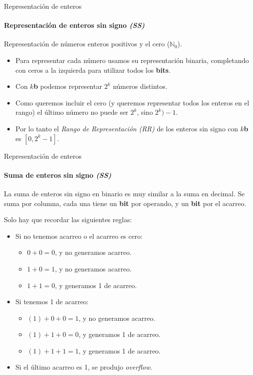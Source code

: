 \documentclass[11pt,a4paper,spanish]{beamer}
\newcommand{\bit}{\textbf{b}}
\begin{document}
\begin{frame}{Representación de enteros}

    \framesubtitle{Representación de enteros sin signo \emph{(SS)}}

    Representación de números enteros positivos y el cero (\(\mathbb{N}_{0}\)).
    \pause

    \begin{itemize}
        \item Para representar cada número usamos su representación binaria,
            completando con ceros a la izquierda para utilizar todos los
            \textbf{bits}. \pause
        \item Con \(k\)\bit{} podemos representar \(2^{k}\) números distintos.
            \pause
        \item Como queremos incluir el cero (y queremos representar todos los
            enteros en el rango) el último número no puede ser \(2^{k}\), sino
            \(2^{k})-1\). \pause
        \item Por lo tanto el \emph{Rango de Representación (RR)} de los
            enteros sin signo con \(k\)\bit{} es \([0,2^{k}-1]\).
    \end{itemize}
\end{frame}

\begin{frame}{Representación de enteros}

    \framesubtitle{Suma de enteros sin signo \emph{(SS)}}

    La suma de enteros sin signo en binario es muy similar a la suma en
    decimal. Se suma por columna, cada una tiene un \textbf{bit} por operando,
    y un \textbf{bit} por el acarreo.

    Solo hay que recordar las siguientes reglas:
    \pause
    \begin{itemize}
        \item Si no tenemos acarreo o el acarreo es cero:
            \begin{itemize}
                \item \(0 + 0 = 0\), y no generamos acarreo.
                \item \(1 + 0 = 1\), y no generamos acarreo.
                \item \(1 + 1 = 0\), y generamos 1 de acarreo.
            \end{itemize}
        \pause
        \item Si tenemos 1 de acarreo:
            \begin{itemize}
                \item \((1) + 0 + 0 = 1\), y no generamos acarreo.
                \item \((1) + 1 + 0 = 0\), y generamos 1 de acarreo.
                \item \((1) + 1 + 1 = 1\), y generamos 1 de acarreo.
            \end{itemize}
        \pause
        \item Si el último acarreo es 1, se produjo \emph{overflow}.
    \end{itemize}
\end{frame}
\end{document}
